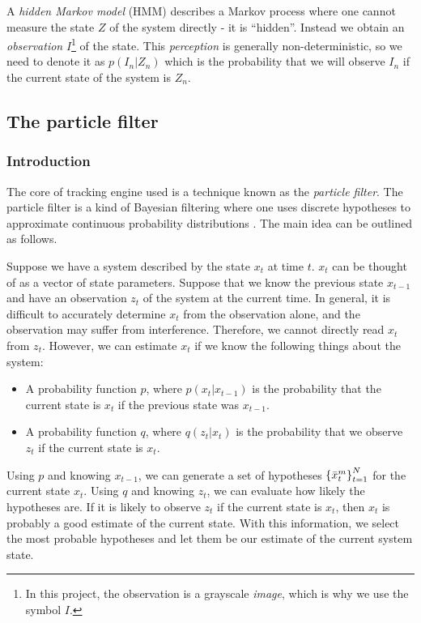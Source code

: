 A \emph{hidden Markov model} (HMM) describes a Markov process where one cannot measure the state $Z$ of the system directly - it is ``hidden''\cite{EncyclopediaMachineLearning}. Instead we obtain an \emph{observation} $I$\footnote{In this project, the observation is a grayscale \emph{image}, which is why we use the symbol $I$.}  of the state. This \emph{perception} is generally non-deterministic, so we need to denote it as $p(I_n|Z_n)$ which is the probability that we will observe $I_n$ if the current state of the system is $Z_n$.

\subsection{The particle filter}

\subsubsection{Introduction}
The core of tracking engine used is a technique known as the \emph{particle filter}. The particle filter is a kind of Bayesian filtering where one uses discrete hypotheses to approximate continuous probability distributions \cite{ProbRob}. The main idea can be outlined as follows.

Suppose we have a system described by the state $x_t$ at time $t$. $x_t$ can be thought of as a vector of state parameters. Suppose that we know the previous state $x_{t-1}$ and have an observation $z_t$ of the system at the current time. In general, it is difficult to accurately determine $x_t$ from the observation alone, and the observation may suffer from interference. Therefore, we cannot directly read $x_t$ from $z_t$. However, we can estimate $x_t$ if we know the following things about the system:

\begin{itemize}
\item A probability function $p$, where $p\left(x_t | x_{t-1}\right)$ is the probability that the current state is $x_t$ if the previous state was $x_{t-1}$.
\item A probability function $q$, where $q\left(z_t | x_t\right)$ is the probability that we observe $z_t$ if the current state is $x_t$.
\end{itemize}

Using $p$ and knowing $x_{t-1}$, we can generate a set of hypotheses $\left\{\bar{x}_{t}^{m}\right\}_{t=1}^{N}$ for the current state $x_t$. Using $q$ and knowing $z_t$, we can evaluate how likely the hypotheses are. If it is likely to observe $z_t$ if the current state is $x_t$, then $x_t$ is probably a good estimate of the current state. With this information, we select the most probable hypotheses and let them be our estimate of the current system state.






